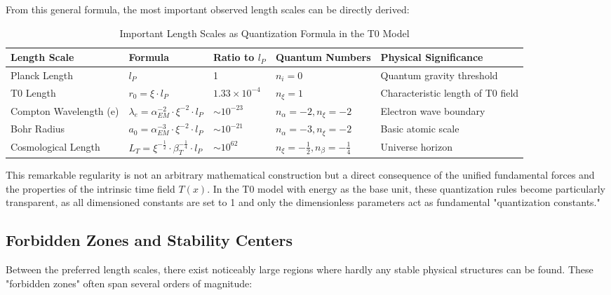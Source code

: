 \documentclass[12pt,a4paper]{article}
\newcommand{\Tfield}{T(x)}
\begin{document}
From this general formula, the most important observed length scales can be directly derived:

\begin{table}[ht]
	\centering
	\begin{adjustbox}{scale=0.7}
		\begin{tabular}{lllll}
			\hline
			\textbf{Length Scale} & \textbf{Formula} & \textbf{Ratio to $l_P$} & \textbf{Quantum Numbers} & \textbf{Physical Significance} \\
			\hline
			Planck Length & $l_P$ & 1 & $n_i = 0$ & Quantum gravity threshold \\
			T0 Length & $r_0 = \xi \cdot l_P$ & $1.33 \times 10^{-4}$ & $n_{\xi} = 1$ & Characteristic length of T0 field \\
			Compton Wavelength (e) & $\lambda_e = \alpha_{EM}^{-2} \cdot \xi^{-2} \cdot l_P$ & $\sim 10^{-23}$ & $n_{\alpha} = -2, n_{\xi} = -2$ & Electron wave boundary \\
			Bohr Radius & $a_0 = \alpha_{EM}^{-3} \cdot \xi^{-2} \cdot l_P$ & $\sim 10^{-21}$ & $n_{\alpha} = -3, n_{\xi} = -2$ & Basic atomic scale \\
			Cosmological Length & $L_T = \xi^{-\frac{1}{2}} \cdot \beta_T^{-\frac{1}{4}} \cdot l_P$ & $\sim 10^{62}$ & $n_{\xi} = -\frac{1}{2}, n_{\beta} = -\frac{1}{4}$ & Universe horizon \\
			\hline
		\end{tabular}
	\end{adjustbox}
	\caption{Important Length Scales as Quantization Formula in the T0 Model}
	\label{tab:quantized_lengths}
\end{table}

This remarkable regularity is not an arbitrary mathematical construction but a direct consequence of the unified fundamental forces and the properties of the intrinsic time field $\Tfield$. In the T0 model with energy as the base unit, these quantization rules become particularly transparent, as all dimensioned constants are set to 1 and only the dimensionless parameters act as fundamental "quantization constants."

\subsection{Forbidden Zones and Stability Centers}

Between the preferred length scales, there exist noticeably large regions where hardly any stable physical structures can be found. These "forbidden zones" often span several orders of magnitude:
\end{document}
